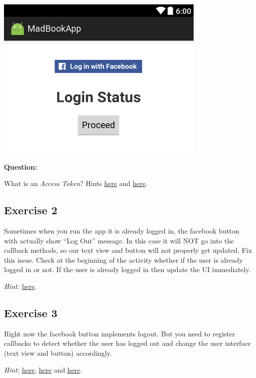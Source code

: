\begin{center}
	\includegraphics[scale=\SourceCodeScale]{chapters/ch12/images/27}
\end{center}

\textbf{Question:} 

What is an \textit{Access Token}? Hints \href{https://developers.facebook.com/docs/facebook-login/access-tokens/}{here} and \href{https://developers.facebook.com/docs/marketing-api/authentication}{here}.

\subsection{Exercise 2}
\label{FBI:exercise2}
Sometimes when you run the app it is already logged in, the facebook button with actually show ``Log Out'' message. In this case it will NOT go into the callback methods, so our text view and button will not properly get updated. Fix this issue. Check at the beginning of the activity whether if the user is already logged in or not. If the user is already logged in then update the UI immediately.

\textit{Hint:} \href{http://stackoverflow.com/questions/29294015/how-to-check-if-user-is-logged-in-with-fb-sdk-4-0-for-android}{here}.

\subsection{Exercise 3}
\label{FBI:exercise3}
Right now the facebook button implements logout. But you need to register callbacks to detect whether the user has logged out and change the user interface (text view and button) accordingly.

\textit{Hint:} \href{http://stackoverflow.com/questions/29305232/facebook-sdk-4-for-android-how-to-log-out-programmatically}{here}, \href{http://stackoverflow.com/questions/30360068/how-to-detect-logout-event-with-the-facebook-android-api-v4}{here} and \href{http://stackoverflow.com/questions/29294015/how-to-check-if-user-is-logged-in-with-fb-sdk-4-0-for-android}{here}.

